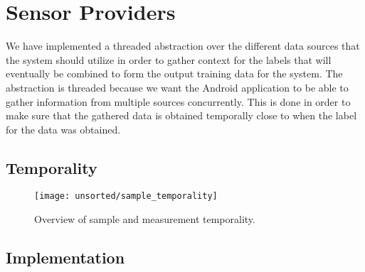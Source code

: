 
\section{Sensor Providers}
\label{sec:sensor_providers}

We have implemented a threaded abstraction over the different data sources that the system should utilize in order to gather context for the labels that will eventually be combined to form the output training data for the system. The abstraction is threaded because we want the Android application to be able to gather information from multiple sources concurrently. This is done in order to make sure that the gathered data is obtained temporally close to when the label for the data was obtained. 

\subsection{Temporality}

\begin{figure}[!htbp]
    \centering
    \texttt{[image: unsorted/sample\_temporality]}
    \caption{Overview of sample and measurement temporality.}
    \label{fig:sample_temporality}
\end{figure}

\subsection{Implementation}

% 

% 